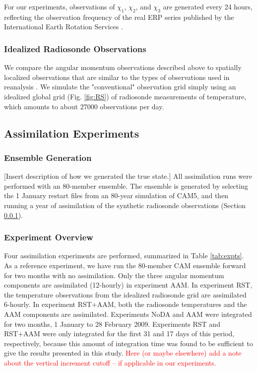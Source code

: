 For our experiments, observations of $\chi_1$, $\chi_2$, and $\chi_3$ are generated every 24 hours, reflecting the observation frequency of the real ERP series published by the International Earth Rotation Services \citep{iers}.  


\subsubsection{Idealized Radiosonde Observations}
\label{sec:radiosondes}

We compare the angular momentum observations described above to spatially localized observations that are similar to the types of observations used in  reanalysis \citep{Dee2005}.
We simulate the "conventional" observation grid simply using an idealized global grid (Fig. \ref{fig:RS}) of radiosonde measurements of temperature, which amounts to about 27000 observations per day.  





\subsection{Assimilation Experiments}
\label{sec:experiments}


\subsubsection{Ensemble Generation}

\textcolor{alert}{[Insert description of how we generated the true state.]}
All assimilation runs were performed with an 80-member ensemble.
The ensemble is generated by selecting the 1 January restart files from an 80-year simulation of CAM5, and then running a year of assimilation of the synthetic radiosonde observations (Section \ref{sec:radiosondes}).

\subsubsection{Experiment Overview}
Four assimilation experiments are performed, summarized in Table \ref{tab:expts}.
As a reference experiment, we have run the 80-member CAM ensemble forward for two months with no assimilation.
Only the three angular momentum components are assimilated (12-hourly) in experiment AAM.  
In experiment RST, the temperature observations from the idealized radiosonde grid are assimilated 6-hourly.
In experiment RST+AAM, both the radiosonde temperatures and the AAM components are assimilated. 
Experiments NoDA and AAM were integrated for two months, 1 January to 28 February 2009.  
Experiments RST and RST+AAM were only integrated for the first 31 and 17 days of this period, respectively, because this amount of integration time was found to be sufficient to give the results presented in this study.
\textcolor{red}{Here (or maybe elsewhere) add a note about the vertical increment cutoff -- if applicable in our experiments.}

